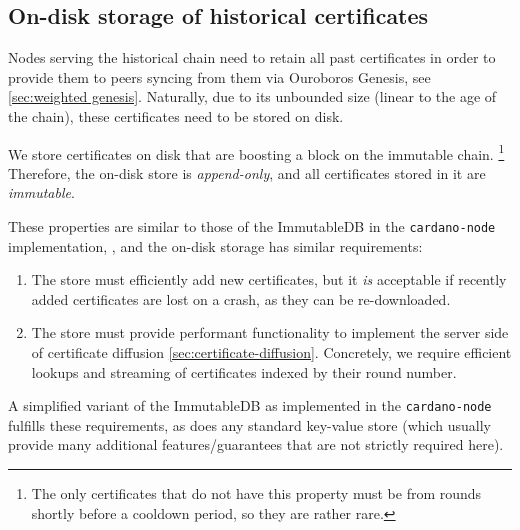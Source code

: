 \subsection{On-disk storage of historical certificates}
Nodes serving the historical chain need to retain all past certificates in order to provide them to peers syncing from them via Ouroboros Genesis, see \cref{sec:weighted genesis}.
Naturally, due to its unbounded size (linear to the age of the chain), these certificates need to be stored on disk.

We store certificates on disk that are boosting a block on the immutable chain.%
\footnote{The only certificates that do not have this property must be from rounds shortly before a cooldown period, so they are rather rare.}
Therefore, the on-disk store is \emph{append-only}, and all certificates stored in it are \emph{immutable}.

These properties are similar to those of the ImmutableDB in the \texttt{cardano-node} implementation, \parencite[chapter~8]{consensus-storage-report}, and the on-disk storage has similar requirements:
\begin{enumerate}
\item
  The store must efficiently add new certificates, but it \emph{is} acceptable if recently added certificates are lost on a crash, as they can be re-downloaded.
\item
  The store must provide performant functionality to implement the server side of certificate diffusion \cref{sec:certificate-diffusion}.
  Concretely, we require efficient lookups and streaming of certificates indexed by their round number.
\end{enumerate}
A simplified variant of the ImmutableDB as implemented in the \texttt{cardano-node} fulfills these requirements, as does any standard key-value store (which usually provide many additional features/guarantees that are not strictly required here).

